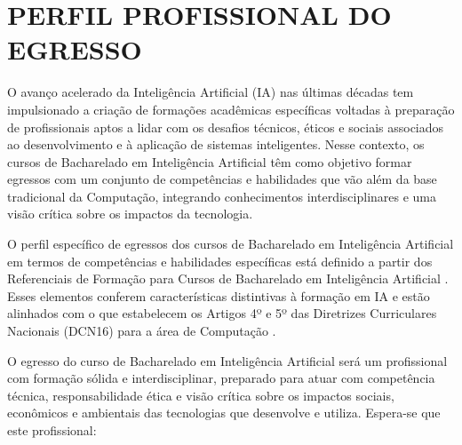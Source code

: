 \chapter{PERFIL PROFISSIONAL DO EGRESSO}
\label{cap:perfil-profissional}


O avanço acelerado da Inteligência Artificial (IA) nas últimas décadas tem impulsionado a criação de formações acadêmicas específicas voltadas à preparação de profissionais aptos a lidar com os desafios técnicos, éticos e sociais associados ao desenvolvimento e à aplicação de sistemas inteligentes. Nesse contexto, os cursos de Bacharelado em Inteligência Artificial têm como objetivo formar egressos com um conjunto de competências e habilidades que vão além da base tradicional da Computação, integrando conhecimentos interdisciplinares e uma visão crítica sobre os impactos da tecnologia.

O perfil específico de egressos dos cursos de Bacharelado em Inteligência Artificial em termos de competências e habilidades específicas está definido a partir dos Referenciais de Formação para Cursos de Bacharelado em Inteligência Artificial \cite{sbc2024}. Esses elementos conferem características distintivas à formação em IA e estão alinhados com o que estabelecem os Artigos 4º e 5º das Diretrizes Curriculares Nacionais (DCN16) para a área de Computação \cite{DCN16}.

O egresso do curso de Bacharelado em Inteligência Artificial será um profissional com formação sólida e interdisciplinar, preparado para atuar com competência técnica, responsabilidade ética e visão crítica sobre os impactos sociais, econômicos e ambientais das tecnologias que desenvolve e utiliza. Espera-se que este profissional:

